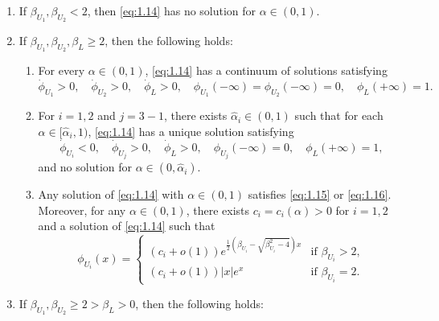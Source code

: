 \begin{theorem}
    \begin{enumerate}[label=(\roman*)]
        \item If \(\beta_{U_1}, \beta_{U_2} < 2\), then \eqref{eq:1.14} has no solution for \(\alpha \in (0, 1)\).
        \item If \(\beta_{U_1}, \beta_{U_2}, \beta_L \geq 2\), then the following holds:
        \begin{enumerate}[label=(\alph*)]
            \item For every \(\alpha \in (0, 1)\), \eqref{eq:1.14} has a continuum of solutions satisfying
            \begin{equation}
                \dot{\phi}_{U_1} > 0, \quad \dot{\phi}_{U_2} > 0, \quad \dot{\phi}_L > 0, \quad \phi_{U_1}(-\infty) = \phi_{U_2}(-\infty) = 0, \quad \phi_L(+\infty) = 1.
                \label{eq:1.15}
            \end{equation}
            \item For \(i = 1,2\) and \(j = 3 - 1\), there exists \(\hat{\alpha}_i \in (0, 1)\) such that for each \(\alpha \in [\hat{\alpha}_i, 1)\), \eqref{eq:1.14} has a unique solution satisfying
            \begin{equation}
                \dot{\phi}_{U_i} < 0, \quad \dot{\phi}_{U_j} > 0, \quad \dot{\phi}_L > 0, \quad \phi_{U_j}(-\infty) = 0, \quad \phi_L(+\infty) = 1,
                \label{eq:1.16}
            \end{equation}
            and no solution for \(\alpha \in (0, \hat{\alpha}_i)\).
            \item Any solution of \eqref{eq:1.14} with \(\alpha \in (0,1)\) satisfies \eqref{eq:1.15} or \eqref{eq:1.16}. Moreover, for any \(\alpha \in (0,1)\), there exists \(c_i = c_i(\alpha) > 0\) for \(i = 1,2\) and a solution of \eqref{eq:1.14} such that
            \begin{equation}
                \phi_{U_i}(x) = \begin{cases}
                    (c_i + o(1))e^{\frac{1}{2}(\beta_{U_i} - \sqrt{\beta_{U_i}^2 - 4})x} & \text{if } \beta_{U_i} > 2, \\
                    (c_i + o(1))\lvert x\rvert e^{x} & \text{if } \beta_{U_i} = 2.
                \end{cases}
                \label{eq:1.17}
            \end{equation}
        \end{enumerate}
        \item If \(\beta_{U_1}, \beta_{U_2} \geq 2 > \beta_L > 0\), then the following holds:

\end{enumerate}
\end{theorem}
